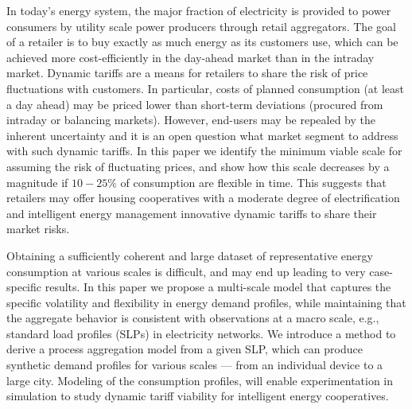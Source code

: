 \documentclass[conference]{IEEEtran}
\begin{document}
In today's energy system, the major fraction of electricity is provided to power consumers by utility scale power producers through retail aggregators. 
The goal of a retailer is to buy exactly as much energy as its customers use, which can be achieved more cost-efficiently in the day-ahead market than in the intraday market. Dynamic tariffs are a means for retailers to share the risk of price fluctuations with customers. In particular, costs of planned consumption (at least a day ahead) may be priced lower than short-term deviations (procured from intraday or balancing markets). However, end-users may be repealed by the inherent uncertainty and it is an open question what market segment to address with such dynamic tariffs. In this paper we identify the minimum viable scale for assuming the risk of fluctuating prices, and show how this scale decreases by a magnitude if $10-25 \%$ of consumption are flexible in time. This suggests that retailers may offer housing cooperatives with a moderate degree of electrification and intelligent energy management innovative dynamic tariffs to share their market risks. %

Obtaining a sufficiently coherent and large dataset of representative energy consumption at various scales is difficult, and may end up leading to very case-specific results. In this paper we propose a multi-scale model that captures the specific volatility and flexibility in energy demand profiles, while maintaining that the aggregate behavior is consistent with observations at a macro scale, e.g., standard load profiles (SLPs) in electricity networks. We introduce a method to derive a process aggregation model from a given SLP, which can produce synthetic demand profiles for various scales --- from an individual device to a large city. Modeling of the consumption profiles, will enable experimentation in simulation to study dynamic tariff viability for intelligent energy cooperatives.

\end{document}
